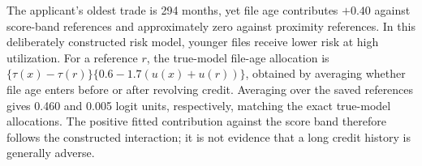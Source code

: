 The applicant's oldest trade is 294 months, yet file age contributes $+0.40$ against score-band references and approximately zero against proximity references. In this deliberately constructed risk model, younger files receive lower risk at high utilization. For a reference $r$, the true-model file-age allocation is $\{\tau(x)-\tau(r)\}\{0.6-1.7(u(x)+u(r))\}$, obtained by averaging whether file age enters before or after revolving credit. Averaging over the saved references gives 0.460 and 0.005 logit units, respectively, matching the exact true-model allocations. The positive fitted contribution against the score band therefore follows the constructed interaction; it is not evidence that a long credit history is generally adverse.
